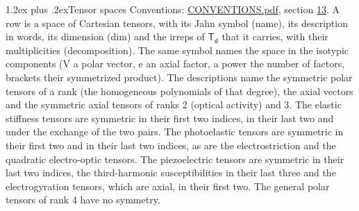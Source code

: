 \documentclass[10pt,a4paper]{article}
\makeatletter
\renewcommand\section{\@startsection{section}{1}{\z@}{-3ex plus -1ex minus -.2ex}%
  {1.2ex plus .2ex}{\normalfont\large\sffamily\bfseries\color{parttitle}}}
\numberwithin{equation}{section}
\newcommand{\grp}[1]{\mathsf{#1}}
\makeatother
\begin{document}
\section{Tensor spaces}\label{s:tensor_spaces}
Conventions: \href{../../CONVENTIONS.pdf}{CONVENTIONS.pdf}, section \href{../../CONVENTIONS.pdf\#conv.13}{13}.
\leavevmode\label{n:head.name}\label{n:head.description}\label{n:head.dim}\label{n:head.decomposition}A row is a space of Cartesian tensors, with its Jahn symbol (name), its description in words, its dimension (dim) and the irreps of $\grp{T_{d}}$ that it carries, with their multiplicities (decomposition). \label{n:label.jahn}The same symbol names the space in the isotypic components (V a polar vector, e an axial factor, a power the number of factors, brackets their symmetrized product). The descriptions name the symmetric polar tensors of a rank (the homogeneous polynomials of that degree), the axial vectors and the symmetric axial tensors of ranks 2 (optical activity) and 3. The elastic stiffness tensors are symmetric in their first two indices, in their last two and under the exchange of the two pairs. The photoelastic tensors are symmetric in their first two and in their last two indices, as are the electrostriction and the quadratic electro-optic tensors. The piezoelectric tensors are symmetric in their last two indices, the third-harmonic susceptibilities in their last three and the electrogyration tensors, which are axial, in their first two. The general polar tensors of rank 4 have no symmetry.
\end{document}
